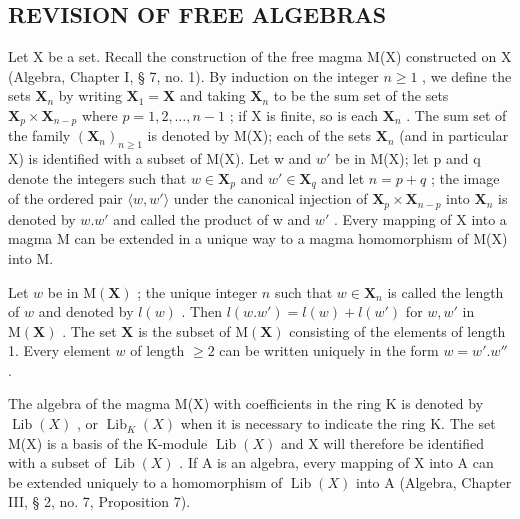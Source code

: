 \subsection{REVISION OF FREE ALGEBRAS}

Let X be a set. Recall the construction of the free magma M(X) constructed on X (Algebra, Chapter I, § 7, no. 1). By induction on the integer \(n \geqslant 1\) , we define the sets \(\mathbf{X}_n\) by writing \(\mathbf{X}_1 = \mathbf{X}\) and taking \(\mathbf{X}_n\) to be the sum set of the sets \(\mathbf{X}_p \times \mathbf{X}_{n-p}\) where \(p = 1, 2, \ldots, n-1\) ; if X is finite, so is each \(\mathbf{X}_n\) . The sum set of the family \((\mathbf{X}_n)_{n \geqslant 1}\) is denoted by M(X); each of the sets \(\mathbf{X}_n\) (and in particular X) is identified with a subset of M(X). Let w and \(w'\) be in M(X); let p and q denote the integers such that \(w \in \mathbf{X}_p\) and \(w' \in \mathbf{X}_q\) and let \(n = p + q\) ; the image of the ordered pair \(\langle w, w' \rangle\) under the canonical injection of \(\mathbf{X}_p \times \mathbf{X}_{n-p}\) into \(\mathbf{X}_n\) is denoted by \(w.w'\) and called the product of w and \(w'\) . Every mapping of X into a magma M can be extended in a unique way to a magma homomorphism of M(X) into M.

Let \(w\) be in \(\mathrm{M}(\mathbf{X})\) ; the unique integer \(n\) such that \(w \in \mathbf{X}_n\) is called the length of \(w\) and denoted by \(l(w)\) . Then \(l(w.w') = l(w) + l(w')\) for \(w, w'\) in \(\mathrm{M}(\mathbf{X})\) . The set \(\mathbf{X}\) is the subset of \(\mathrm{M}(\mathbf{X})\) consisting of the elements of length 1. Every element \(w\) of length \(\geqslant 2\) can be written uniquely in the form \(w = w'.w''\) .

The algebra of the magma M(X) with coefficients in the ring K is denoted by \(\operatorname{Lib}(X)\) , or \(\operatorname{Lib}_{K}(X)\) when it is necessary to indicate the ring K. The set M(X) is a basis of the K-module \(\operatorname{Lib}(X)\) and X will therefore be identified with a subset of \(\operatorname{Lib}(X)\) . If A is an algebra, every mapping of X into A can be extended uniquely to a homomorphism of \(\operatorname{Lib}(X)\) into A (Algebra, Chapter III, § 2, no. 7, Proposition 7).

